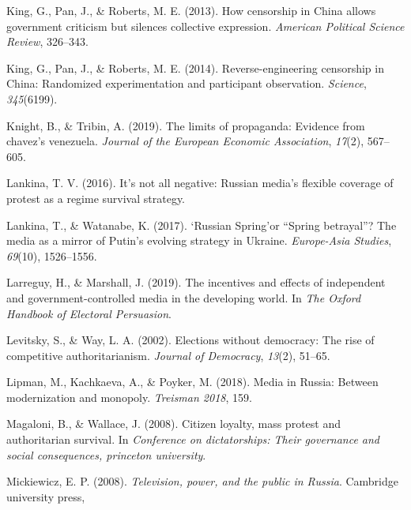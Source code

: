 \documentclass[
  english,
  man]{apa6}
\begin{document}
\leavevmode\hypertarget{ref-kingHowCensorshipChina2013}{}%
King, G., Pan, J., \& Roberts, M. E. (2013). How censorship in China allows government criticism but silences collective expression. \emph{American Political Science Review}, 326--343.

\leavevmode\hypertarget{ref-kingReverseengineeringCensorshipChina2014}{}%
King, G., Pan, J., \& Roberts, M. E. (2014). Reverse-engineering censorship in China: Randomized experimentation and participant observation. \emph{Science}, \emph{345}(6199).

\leavevmode\hypertarget{ref-knightLimitsPropagandaEvidence2019}{}%
Knight, B., \& Tribin, A. (2019). The limits of propaganda: Evidence from chavez's venezuela. \emph{Journal of the European Economic Association}, \emph{17}(2), 567--605.

\leavevmode\hypertarget{ref-lankinaItNotAll2016}{}%
Lankina, T. V. (2016). It's not all negative: Russian media's flexible coverage of protest as a regime survival strategy.

\leavevmode\hypertarget{ref-lankinaRussianSpringSpring2017}{}%
Lankina, T., \& Watanabe, K. (2017). `Russian Spring'or ``Spring betrayal''? The media as a mirror of Putin's evolving strategy in Ukraine. \emph{Europe-Asia Studies}, \emph{69}(10), 1526--1556.

\leavevmode\hypertarget{ref-larreguyIncentivesEffectsIndependent2019}{}%
Larreguy, H., \& Marshall, J. (2019). The incentives and effects of independent and government-controlled media in the developing world. In \emph{The Oxford Handbook of Electoral Persuasion}.

\leavevmode\hypertarget{ref-levitskyElectionsDemocracyRise2002}{}%
Levitsky, S., \& Way, L. A. (2002). Elections without democracy: The rise of competitive authoritarianism. \emph{Journal of Democracy}, \emph{13}(2), 51--65.

\leavevmode\hypertarget{ref-lipmanMediaRussiaModernization2018}{}%
Lipman, M., Kachkaeva, A., \& Poyker, M. (2018). Media in Russia: Between modernization and monopoly. \emph{Treisman 2018}, 159.

\leavevmode\hypertarget{ref-magaloniCitizenLoyaltyMass2008}{}%
Magaloni, B., \& Wallace, J. (2008). Citizen loyalty, mass protest and authoritarian survival. In \emph{Conference on dictatorships: Their governance and social consequences, princeton university}.

\leavevmode\hypertarget{ref-mickiewiczTelevisionPowerPublic2008}{}%
Mickiewicz, E. P. (2008). \emph{Television, power, and the public in Russia}. Cambridge university press,
\end{document}
